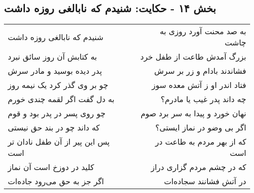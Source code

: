 \begin{center}
\section*{بخش ۱۴ - حکایت: شنیدم که نابالغی روزه داشت}
\label{sec:014}
\begin{longtable}{l p{0.5cm} r}
شنیدم که نابالغی روزه داشت
&&
به صد محنت آورد روزی به چاشت
\\
به کتابش آن روز سائق نبرد
&&
بزرگ آمدش طاعت از طفل خرد
\\
پدر دیده بوسید و مادر سرش
&&
فشاندند بادام و زر بر سرش
\\
چو بر وی گذر کرد یک نیمه روز
&&
فتاد اندر او ز آتش معده سوز
\\
به دل گفت اگر لقمه چندی خورم
&&
چه داند پدر غیب یا مادرم؟
\\
چو روی پسر در پدر بود و قوم
&&
نهان خورد و پیدا به سر برد صوم
\\
که داند چو در بند حق نیستی
&&
اگر بی وضو در نماز ایستی؟
\\
پس این پیر از آن طفل نادان تر است
&&
که از بهر مردم به طاعت در است
\\
کلید در دوزخ است آن نماز
&&
که در چشم مردم گزاری دراز
\\
اگر جز به حق می‌رود جاده‌ات
&&
در آتش فشانند سجاده‌ات
\\
\end{longtable}
\end{center}
